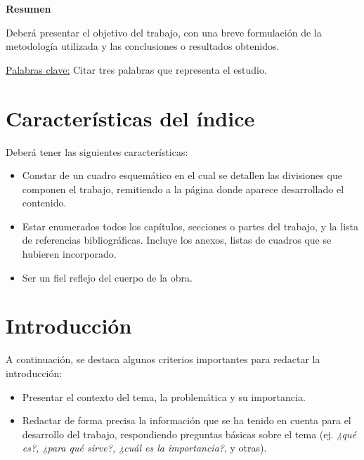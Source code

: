 \documentclass{article}[11pt]
\begin{document}

\renewcommand{\thepage}{\roman{page}}           %

\begin{center}
\normalsize \textbf{Resumen}
\end{center}

\noindent Deberá presentar el objetivo del trabajo, con una breve formulación de la metodología utilizada y las conclusiones o resultados obtenidos. 
\vspace{0.3cm}

\noindent \underline{Palabras clave:} Citar tres palabras que representa el estudio.
\newpage

\listoffigures
{}
\newpage
\thispagestyle{empty} %

\tableofcontents
\newpage
{} %

\section{Características del índice}

Deberá tener las siguientes características:\\
\begin{itemize}
\item Constar de un cuadro esquemático en el cual se detallen las divisiones que componen el trabajo, remitiendo a la página donde aparece desarrollado el contenido.
\item Estar enumerados todos los capítulos, secciones o partes del trabajo, y la lista de referencias bibliográficas. Incluye los anexos, listas de cuadros que se hubieren incorporado.
\item Ser un fiel reflejo del cuerpo de la obra.
\end{itemize}

\section{Introducción}

A continuación, se destaca algunos criterios importantes para redactar la introducción:\\
\begin{itemize}
\item Presentar el contexto del tema, la problemática y su importancia.
\item Redactar de forma precisa la información que se ha tenido en cuenta para el desarrollo del trabajo, respondiendo preguntas básicas sobre el tema (ej. \textit{¿qué es?, ¿para qué sirve?, ¿cuál es la importancia?}, y otras).
\end{itemize}
\end{document}
